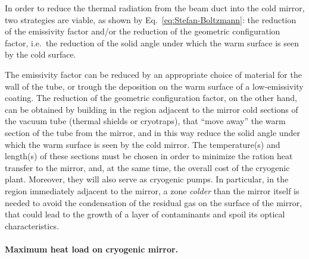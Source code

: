 In order to reduce the thermal radiation from the beam duct into the cold mirror, two strategies are viable, as shown by Eq.~\ref{eq:Stefan-Boltzmann}: the reduction of the emissivity factor and/or the reduction of the geometric configuration factor, i.e.\ the reduction of the solid angle under which the warm surface is seen by the cold surface.

The emissivity factor can be reduced by an appropriate choice of material for the wall of the tube, or trough the deposition on the warm surface of a low-emissivity coating. The reduction of the geometric configuration factor, on the other hand, can be obtained by building in the region adjacent to the mirror cold sections of the vacuum tube (thermal shields or cryotraps), that ``move away'' the warm section of the tube from the mirror, and in this way reduce the solid angle under which the warm surface is seen by the cold mirror.  The temperature(s) and length(s) of these sections must be chosen in order to minimize the ration heat transfer to the mirror, and, at the same time, the overall cost of the cryogenic plant. Moreover, they will also serve as cryogenic pumps. In particular, in the region immediately adjacent to the mirror, a zone \emph{colder} than the mirror itself is needed to avoid the condensation of the residual gas on the surface of the mirror, that could lead to the growth of a layer of contaminants and spoil its optical characteristics.
 
\paragraph{Maximum heat load on cryogenic mirror.\newline}

